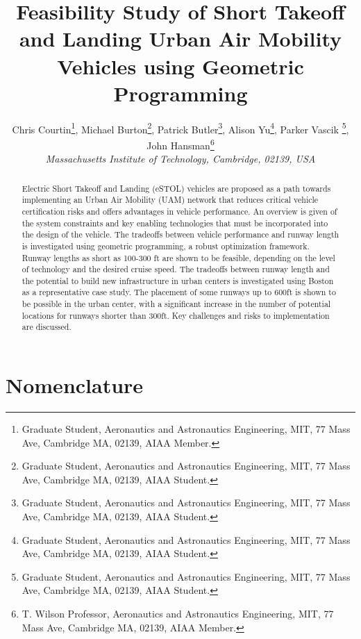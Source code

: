 \documentclass[]{aiaa-tc}%
\title{Feasibility Study of Short Takeoff and Landing Urban Air Mobility Vehicles using Geometric Programming}
\author{
  Chris Courtin\thanks{Graduate Student, Aeronautics and Astronautics Engineering, MIT, 77 Mass Ave, Cambridge MA, 02139, AIAA Member.}, 
  Michael Burton\thanks{Graduate Student, Aeronautics and Astronautics Engineering, MIT, 77 Mass Ave, Cambridge MA, 02139, AIAA Student.}, 
  Patrick Butler\thanks{Graduate Student, Aeronautics and Astronautics Engineering, MIT, 77 Mass Ave, Cambridge MA, 02139, AIAA Student.}, 
  Alison Yu\thanks{Graduate Student, Aeronautics and Astronautics Engineering, MIT, 77 Mass Ave, Cambridge MA, 02139, AIAA Student.}, 
 Parker Vascik \thanks{Graduate Student, Aeronautics and Astronautics Engineering, MIT, 77 Mass Ave, Cambridge MA, 02139, AIAA Student.}, 
  John Hansman\thanks{T. Wilson Professor, Aeronautics and Astronautics Engineering, MIT, 77 Mass Ave, Cambridge MA, 02139, AIAA Member.} \\
  {\normalsize\itshape
   Massachusetts Institute of Technology, Cambridge, 02139, USA}\\
 }
\begin{document}
\graphicspath{{./figs/}}
\maketitle

\begin{abstract}
    Electric Short Takeoff and Landing (eSTOL) vehicles are proposed as a path towards implementing an Urban Air Mobility (UAM) network that reduces critical vehicle certification risks and offers advantages in vehicle performance.  An overview is given of the system constraints and key enabling technologies that must be incorporated into the design of the vehicle. The tradeoffs between vehicle performance and runway length is investigated using geometric programming, a robust optimization framework.  Runway lengths as short as 100-300 ft are shown to be feasible, depending on the level of technology and the desired cruise speed. The tradeoffs between runway length and the potential to build new infrastructure in urban centers is investigated using Boston as a representative case study.  The placement of some runways up to 600ft is shown to be possible in the urban center, with a significant increase in the number of potential locations for runways shorter than 300ft. Key challenges and risks to implementation are discussed.  


\end{abstract}

\section*{Nomenclature}
\end{document}
